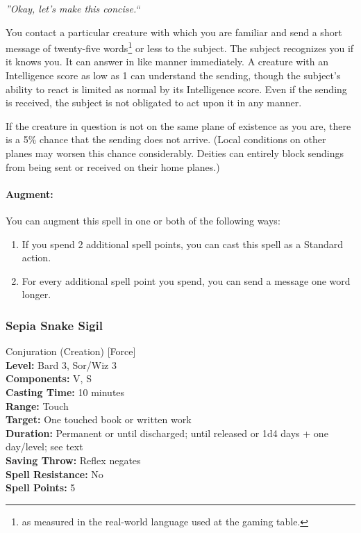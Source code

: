 \emph{''Okay, let's make this concise.``}

You contact a particular creature with which you are familiar and send a short message of twenty-five words\footnote{as measured in the real-world language used at the gaming table.} or less to the subject.
The subject recognizes you if it knows you. 
It can answer in like manner immediately. 
A creature with an Intelligence score as low as 1 can understand the sending, though the subject's ability to react is limited as normal by its Intelligence score. 
Even if the sending is received, the subject is not obligated to act upon it in any manner.

If the creature in question is not on the same plane of existence as you are, there is a 5\% chance that the sending does not arrive. 
(Local conditions on other planes may worsen this chance considerably. Deities can entirely block sendings from being sent or received on their home planes.) 

\paragraph{Augment:} You can augment this spell in one or both of the following ways:
\begin{enumerate}
 \item If you spend 2 additional spell points, you can cast this spell as a Standard action.
 \item For every additional spell point you spend, you can send a message one word longer.
\end{enumerate}

\subsubsection{Sepia Snake Sigil}
\label{Spell:SepiaSnakeSigil}
Conjuration (Creation) [Force]
\\ \textbf{Level:} Bard 3, Sor/Wiz 3
\\ \textbf{Components:} V, S
\\ \textbf{Casting Time:} 10 minutes
\\ \textbf{Range:} Touch
\\ \textbf{Target:} One touched book or written work
\\ \textbf{Duration:} Permanent or until discharged; until released or 1d4 days + one day/level; see text
\\ \textbf{Saving Throw:} Reflex negates
\\ \textbf{Spell Resistance:} No
\\ \textbf{Spell Points:} 5

